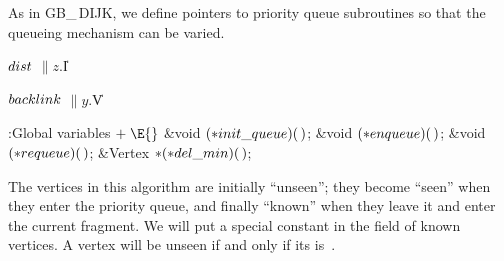 As in {\sc GB\_\,DIJK}, we define pointers to priority queue subroutines
so that the queueing mechanism can be varied.

\Y\B\4\D$\\{dist}$ \5
$\|z.{}$\|I\par
\B\4\D$\\{backlink}$ \5
$\|y.{}$\|V\par
\Y\B\4:Global variables\X${}\mathrel+\E{}$\6
\&{void} ${}({*}\\{init\_queue})(\,){}$;\6
\&{void} ${}({*}\\{enqueue})(\,){}$;\6
\&{void} ${}({*}\\{requeue})(\,){}$;\6
\&{Vertex} ${}{*}({*}\\{del\_min})(\,){}$;\par
\fi

The vertices in this algorithm are initially ``unseen''; they become
``seen'' when they enter the priority queue, and finally ``known''
when they leave it and enter the current fragment.
We will put a special constant in the  field
of known vertices. A vertex will be unseen if and only if its
 is~\PB{$\NULL$}.

